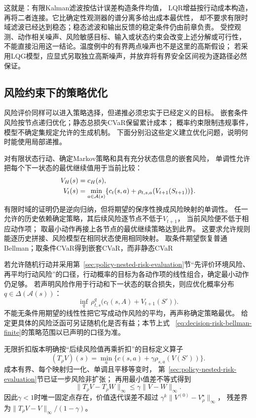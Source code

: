 这就是：有限Kalman滤波按估计误差构造条件均值，
LQR增益按行动成本构造，再将二者连接。它比确定性观测器的谱分离多给出成本最优性，
却不要求有限时域滤波已经达到稳态；稳态滤波和输出反馈的稳定条件仍由前章负责。
受控观测、动作相关噪声、风险敏感目标、输入或状态约束会改变上述分解或可行性，
不能直接沿用这一结论。温度例中的有界两点噪声也不是这里的高斯假设；
若采用LQG模型，应显式另取独立高斯噪声，并放弃将有界安全区间视为逐路径必然保证。

\subsection{风险约束下的策略优化}
\label{sec:policy-risk-optimization}

风险评价同样可以进入策略选择，但递推必须忠实于已经定义的目标。
嵌套条件风险按节点递归优化；静态总损失CVaR保留累计成本；
概率约束限制违规事件，模型不确定集规定允许的生成机制。
下面分别沿这些定义建立优化问题，说明何时能使用局部递推。

对有限状态行动、确定Markov策略和具有充分状态信息的嵌套风险，
单调性允许把每个下一状态的最优继续值用于当前比较：
\begin{align}
  V_H(s)&=c_H(s),\notag\\
  V_t(s)&=\min_{a\in\mathcal A(s)}
    \{c_t(s,a)+\rho_{t,s,a}(V_{t+1}(S_{t+1}))\}.
  \label{eq:decision-risk-bellman-finite}
\end{align}
有限时域的证明仍是逆向归纳，但将期望的保序性换成风险映射的单调性。
任一允许的历史依赖确定策略，其后续风险逐节点不低于$V_{t+1}$，
当前风险便不低于相应动作项；
取最小动作再接上各节点的最优继续策略达到此界。
这要求允许规则能逐历史拼接、风险模型在相同状态使用相同映射。
取条件期望恢复普通Bellman；取条件CVaR得到嵌套CVaR，而非静态CVaR

若允许随机行动并采用第~\ref{sec:policy-nested-risk-evaluation}节“先评价环境风险、
再平均行动风险”的口径，行动概率的目标为各动作项的线性组合，确定最小动作仍足够。
若声明风险作用于行动和下一状态的联合损失，则应优化概率分布$q\in\Delta(\mathcal A(s))$：
\[
  \inf_q\,\rho^q_{t,s}\bigl(c_t(s,A)+V_{t+1}(S')\bigr).
\]
不能无条件用期望的线性性把它写成动作风险的平均，再声称确定策略最优。
给定更具体的风险泛函可另证随机化是否有益；本节上式
~\eqref{eq:decision-risk-bellman-finite}的策略范围以已声明的口径为准。

无限折扣版本明确按“后续风险值再乘折扣”的目标定义算子
\begin{equation}
  (T_\rho V)(s)=\min_a
    \{c(s,a)+\gamma\rho_{s,a}(V(S'))\}.
  \label{eq:decision-risk-bellman-operator}
\end{equation}
成本有界、每个映射归一化、单调且平移等变时，
第~\ref{sec:policy-nested-risk-evaluation}节已证一步风险非扩张；
再用最小值差不等式得到
\begin{equation}
  \lVert T_\rho V-T_\rho W\rVert_\infty
  \leq\gamma\lVert V-W\rVert_\infty.
  \label{eq:decision-risk-bellman-contraction}
\end{equation}
因此$\gamma<1$时唯一固定点存在，价值迭代误差不超过
$\gamma^k\lVert V^{(0)}-V^\star_\rho\rVert_\infty$，
残差界为$\lVert T_\rho V-V\rVert_\infty/(1-\gamma)$。

